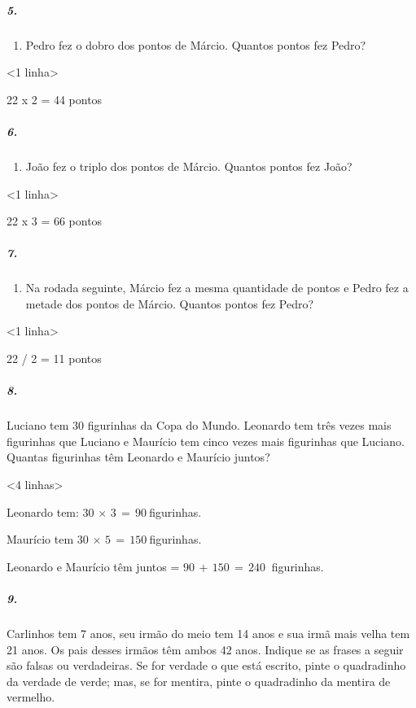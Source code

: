 \subparagraph{5.}\label{section-93}

\begin{enumerate}
\def\labelenumi{\Alph{enumi})}
\item
  Pedro fez o dobro dos pontos de Márcio. Quantos pontos fez Pedro?
\end{enumerate}

\textless{}1 linha\textgreater{}

22 x 2 = 44 pontos

\subparagraph{6.}\label{section-93}

\begin{enumerate}
\def\labelenumi{\Alph{enumi})}
\item
  João fez o triplo dos pontos de Márcio. Quantos pontos fez João?
\end{enumerate}

\textless{}1 linha\textgreater{}

22 x 3 = 66 pontos

\subparagraph{7.}\label{section-93}

\begin{enumerate}
\def\labelenumi{\Alph{enumi})}
\item
  Na rodada seguinte, Márcio fez a mesma quantidade de pontos e Pedro
  fez a metade dos pontos de Márcio. Quantos pontos fez Pedro?
\end{enumerate}

\textless{}1 linha\textgreater{}

22 / 2 = 11 pontos

\subparagraph{8.}\label{section-94}

Luciano tem 30 figurinhas da Copa do Mundo. Leonardo tem três
vezes mais figurinhas que Luciano e Maurício tem cinco vezes mais figurinhas que Luciano.
Quantas figurinhas têm Leonardo e Maurício juntos?

\textless{}4 linhas\textgreater{}

Leonardo tem: \(30\, \times \, 3\, = \, 90\ \)figurinhas.

Maurício tem \(30\, \times \, 5\, = \, 150\ \)figurinhas.

Leonardo e Maurício têm juntos = \(90\, + \, 150\, = \, 240\ \)
figurinhas.

\subparagraph{9.}\label{section-95}

Carlinhos tem 7 anos, seu irmão do meio tem 14 anos e sua irmã mais
velha tem 21 anos. Os pais desses irmãos têm ambos 42 anos. Indique se
as frases a seguir são falsas ou verdadeiras. Se for verdade o que está
escrito, pinte o quadradinho da verdade de verde; mas, se for mentira,
pinte o quadradinho da mentira de vermelho.

